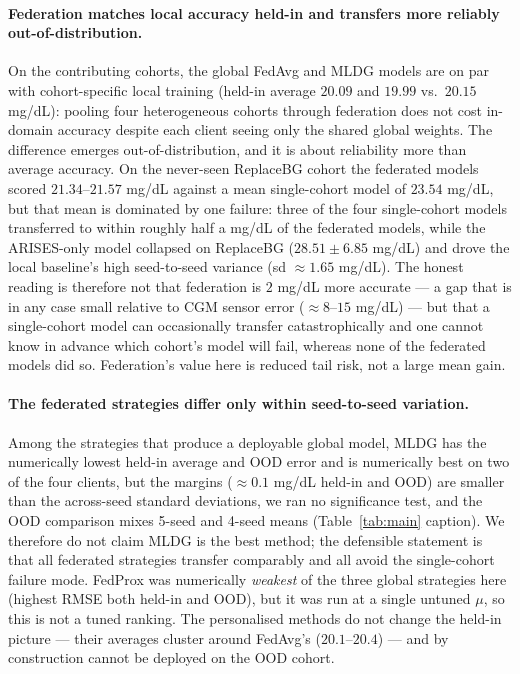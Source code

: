 \documentclass[10pt,letterpaper]{article}
\begin{document}
\paragraph{Federation matches local accuracy held-in and transfers more reliably
out-of-distribution.} On the contributing cohorts, the global FedAvg and MLDG
models are on par with cohort-specific local training (held-in average $20.09$
and $19.99$ vs.\ $20.15$ mg/dL): pooling four heterogeneous cohorts through
federation does not cost in-domain accuracy despite each client seeing only the
shared global weights. The difference emerges out-of-distribution, and it is
about reliability more than average accuracy. On the never-seen ReplaceBG cohort
the federated models scored $21.34$--$21.57$ mg/dL against a mean single-cohort
model of $23.54$ mg/dL, but that mean is dominated by one failure: three of the
four single-cohort models transferred to within roughly half a mg/dL of the
federated models, while the ARISES-only model collapsed on ReplaceBG
($28.51 \pm 6.85$ mg/dL) and drove the local baseline's high seed-to-seed
variance (sd $\approx 1.65$ mg/dL). The honest reading is therefore not that
federation is $2$ mg/dL more accurate --- a gap that is in any case small
relative to CGM sensor error ($\approx 8$--$15$ mg/dL) --- but that a
single-cohort model can occasionally transfer catastrophically and one cannot
know in advance which cohort's model will fail, whereas none of the federated
models did so. Federation's value here is reduced tail risk, not a large mean
gain.

\paragraph{The federated strategies differ only within seed-to-seed variation.}
Among the strategies that produce a deployable global model, MLDG has the
numerically lowest held-in average and OOD error and is numerically best on two
of the four clients, but the margins ($\approx 0.1$ mg/dL held-in and OOD) are
smaller than the across-seed standard deviations, we ran no significance test,
and the OOD comparison mixes 5-seed and 4-seed means (Table~\ref{tab:main}
caption). We therefore do not claim MLDG is the best method; the defensible
statement is that all federated strategies transfer comparably and all avoid the
single-cohort failure mode. FedProx was numerically \emph{weakest} of the three
global strategies here (highest RMSE both held-in and OOD), but it was run at a
single untuned $\mu$, so this is not a tuned ranking. The personalised methods do
not change the held-in picture --- their averages cluster around FedAvg's
($20.1$--$20.4$) --- and by construction cannot be deployed on the OOD cohort.
\end{document}

